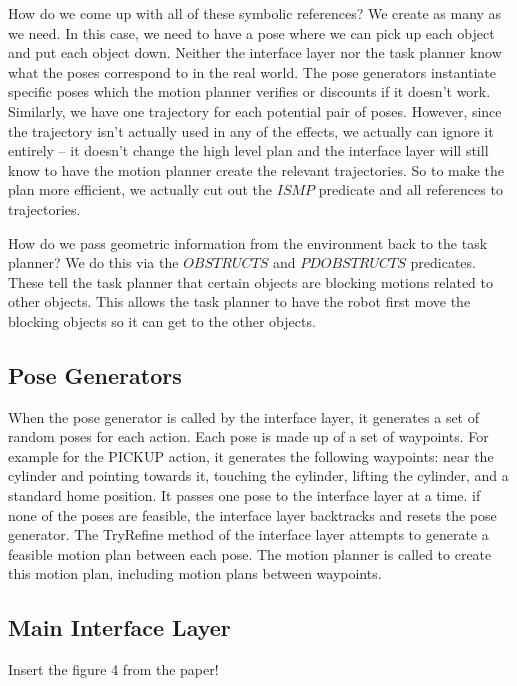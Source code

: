 \documentclass[12pt]{article}
\begin{document}
How do we come up with all of these symbolic references?  
We create as many as we need.  
In this case, we need to have a pose where we can pick up each object and put each object down.  
Neither the interface layer nor the task planner know what the poses correspond to in the real world.
The pose generators instantiate specific poses which the motion planner verifies or discounts if it doesn't work.
Similarly, we have one trajectory for each potential pair of poses.  
However, since the trajectory isn't actually used in any of the effects, we actually can ignore it entirely -- it doesn't change the high level plan and the interface layer will still know to have the motion planner create the relevant trajectories. 
So to make the plan more efficient, we actually cut out the $ISMP$ predicate and all references to trajectories.

How do we pass geometric information from the environment back to the task planner?  
We do this via the $OBSTRUCTS$ and $PDOBSTRUCTS$ predicates.  
These tell the task planner that certain objects are blocking motions related to other objects.  
This allows the task planner to have the robot first move the blocking objects so it can get to the other objects.


\subsection{Pose Generators}

When the pose generator is called by the interface layer, it generates a set of random poses for each action. Each pose is made up of a set of waypoints. For example for the PICKUP action, it generates the following waypoints: near the cylinder and pointing towards it, touching the cylinder, lifting the cylinder, and a standard home position. It passes one pose to the interface layer at a time.  if none of the poses are feasible, the interface layer backtracks and resets the pose generator. The TryRefine method of the interface layer attempts to generate a feasible motion plan between each pose.  The motion planner is called to create this motion plan, including motion plans between waypoints.

\subsection{Main Interface Layer}

Insert the figure 4 from the paper!
\end{document}
